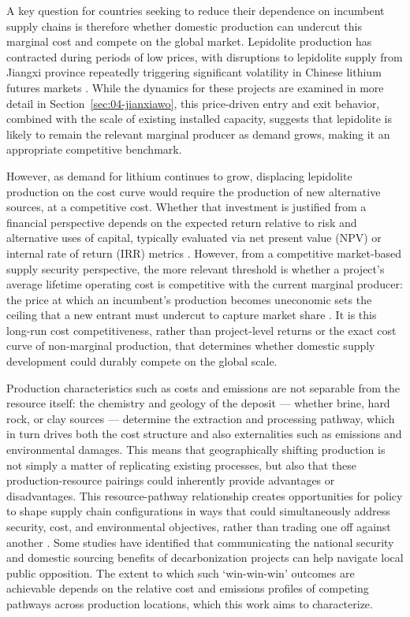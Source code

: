 A key question for countries seeking to reduce their dependence on incumbent supply chains is therefore whether domestic production can undercut this marginal cost and compete on the global market. Lepidolite production has contracted during periods of low prices, with disruptions to lepidolite supply from Jiangxi province repeatedly triggering significant volatility in Chinese lithium futures markets \cite{liChinasCATLSuspends2025, benchmarkteamRestartCATLsJianxiawo2026}. While the dynamics for these projects are examined in more detail in Section~\ref{sec:04-jianxiawo}, this price-driven entry and exit behavior, combined with the scale of existing installed capacity, suggests that lepidolite is likely to remain the relevant marginal producer as demand grows, making it an appropriate competitive benchmark.

However, as demand for lithium continues to grow, displacing lepidolite production on the cost curve would require the production of new alternative sources, at a competitive cost. Whether that investment is justified from a financial perspective depends on the expected return relative to risk and alternative uses of capital, typically evaluated via net present value (NPV) or internal rate of return (IRR) metrics \cite{pindyckIrreversibilityUncertaintyInvestment1990, brennanEvaluatingNaturalResource1985}. However, from a competitive market-based supply security perspective, the more relevant threshold is whether a project's average lifetime operating cost is competitive with the current marginal producer: the price at which an incumbent's production becomes uneconomic sets the ceiling that a new entrant must undercut to capture market share \cite{tiltonMineralEconomicsPolicy2016}. It is this long-run cost competitiveness, rather than project-level returns or the exact cost curve of non-marginal production, that determines whether domestic supply development could durably compete on the global scale. 

Production characteristics such as costs and emissions are not separable from the resource itself: the chemistry and geology of the deposit --- whether brine, hard rock, or clay sources --- determine the extraction and processing pathway, which in turn drives both the cost structure and also externalities such as emissions and environmental damages. This means that geographically shifting production is not simply a matter of replicating existing processes, but also that these production-resource pairings could inherently provide advantages or disadvantages. This resource-pathway relationship creates opportunities for policy to shape supply chain configurations in ways that could simultaneously address security, cost, and environmental objectives, rather than trading one off against another \cite{riofrancosSecuritySustainabilityNexus2023, haddadHowMakeLithium2023, buschEffectsDemandRecycling2025}. Some studies \cite{ujiPursuingDecarbonizationNational2023} have identified that communicating the national security and domestic sourcing benefits of decarbonization projects can help navigate local public opposition. The extent to which such `win-win-win' outcomes are achievable depends on the relative cost and emissions profiles of competing pathways across production locations, which this work aims to characterize.

